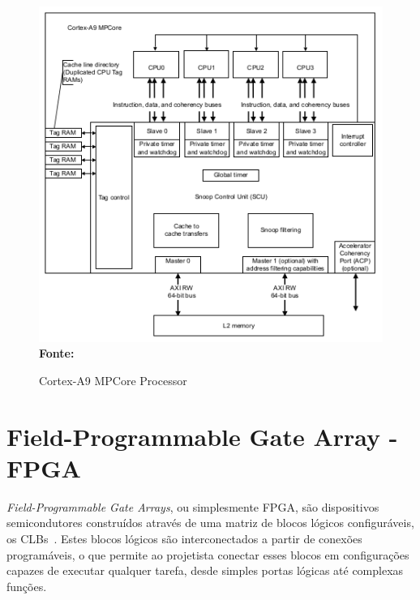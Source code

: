 \begin{figure}[ht]
	\caption{Cortex-A9 MPCore Processor}
	\begin{center}
		\includegraphics[scale=0.7]{imagens/mpcoreA9.png}\\
		{\small \textbf{Fonte:} }
    \end{center}\label{fig:mpcore}
\end{figure}


\section{Field-Programmable Gate Array - FPGA}
\textit{Field-Programmable Gate Arrays}, ou simplesmente FPGA, são dispositivos semicondutores construídos através de uma matriz de blocos lógicos configuráveis, os CLBs~\cite{FPGAXilinx}. Estes blocos lógicos são interconectados a partir de conexões programáveis, o que permite ao projetista conectar esses blocos em configurações capazes de executar qualquer tarefa, desde simples portas lógicas até complexas funções.


